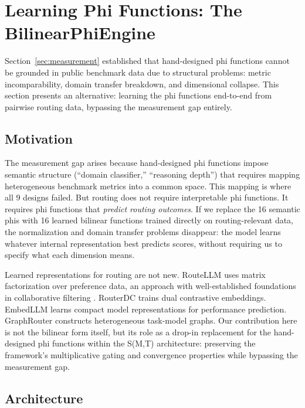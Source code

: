 \section{Learning Phi Functions: The BilinearPhiEngine}
\label{sec:learned_phi}

Section~\ref{sec:measurement} established that hand-designed phi functions cannot be grounded in public benchmark data due to structural problems: metric incomparability, domain transfer breakdown, and dimensional collapse. This section presents an alternative: learning the phi functions end-to-end from pairwise routing data, bypassing the measurement gap entirely.

\subsection{Motivation}

The measurement gap arises because hand-designed phi functions impose semantic structure (``domain classifier,'' ``reasoning depth'') that requires mapping heterogeneous benchmark metrics into a common space. This mapping is where all 9 designs failed. But routing does not require interpretable phi functions. It requires phi functions that \emph{predict routing outcomes}. If we replace the 16 semantic phis with 16 learned bilinear functions trained directly on routing-relevant data, the normalization and domain transfer problems disappear: the model learns whatever internal representation best predicts scores, without requiring us to specify what each dimension means.

Learned representations for routing are not new. RouteLLM \citep{ong2024routellm} uses matrix factorization over preference data, an approach with well-established foundations in collaborative filtering \citep{koren2009matrix}. RouterDC \citep{chen2024routerdc} trains dual contrastive embeddings. EmbedLLM \citep{zhuang2024embedllm} learns compact model representations for performance prediction. GraphRouter \citep{feng2024graphrouter} constructs heterogeneous task-model graphs. Our contribution here is not the bilinear form itself, but its role as a drop-in replacement for the hand-designed phi functions within the S(M,T) architecture: preserving the framework's multiplicative gating and convergence properties while bypassing the measurement gap.

\subsection{Architecture}

